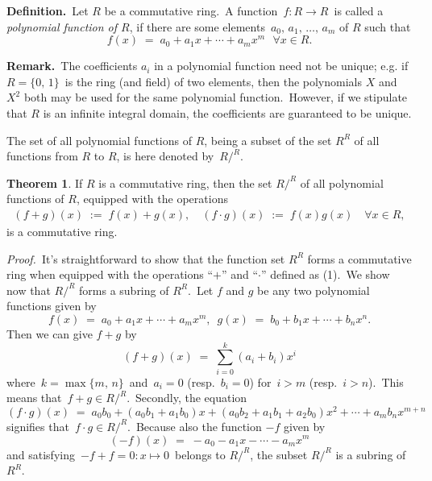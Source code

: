 \documentclass[12pt]{article}
\theoremstyle{definition}
\newtheorem*{thmplain}{Theorem}
\begin{document}
\textbf{Definition.}\, Let $R$ be a commutative ring.\, A function \,$f: R\to R$\, is called a {\em polynomial function of $R$}, if there are some elements \,$a_0,\,a_1,\,\ldots,\,a_m$ of $R$ such that
   $$f(x) \;=\; a_0\!+\!a_1x\!+\cdots+\!a_mx^m \,\,\,\, \forall x\in R.$$

\textbf{Remark.}\, The coefficients $a_i$ in a polynomial function need not be unique; e.g. if\, $R = \{0,\,1\}$\, is the ring (and field) of two elements, then the polynomials $X$ and $X^2$ both may be used for the same polynomial function.\, However, if we stipulate that $R$ is an infinite integral domain, the coefficients are guaranteed to be unique.

The set of all polynomial functions of $R$, being a subset of the set $R^R$ of all functions from $R$ to $R$, is here denoted by\, $R/^R$.

\begin{thmplain}
If $R$ is a commutative ring, then the set $R/^R$ of all polynomial functions of $R$, equipped with the operations 
\begin{align}
(f\!+\!g)(x) \;:=\; f(x)\!+\!g(x), \quad (f\!\cdot\!g)(x) \;:=\; f(x)g(x) \quad \forall x\in R,
\end{align}
is a commutative ring.
\end{thmplain}

{\em Proof.}\, It's straightforward to show that the function set $R^R$ forms a commutative ring when equipped with the operations ``$+$'' and ``$\cdot$'' defined as (1).\, We show now that $R/^R$ forms a subring of $R^R$.\, Let $f$ and $g$ be any two polynomial functions given by
$$f(x) \;=\; a_0\!+\!a_1x\!+\cdots+\!a_mx^m, \,\,\, g(x) \;=\; b_0\!+\!b_1x\!+\cdots+\!b_nx^n.$$
Then we can give $f\!+\!g$ by
  $$(f\!+\!g)(x) \;=\; \sum_{i=0}^k(a_i\!+\!b_i)x^i$$
where\, $k = \max\{m,\,n\}$\, and\, $a_i = 0$ (resp.\, $b_i = 0$) for\, $i > m$ (resp.\, $i > n$).\, This means that\, $f\!+\!g \in R/^R$.\, Secondly, the equation
$$(f\!\cdot\!g)(x) \;=\; a_0b_0+(a_0b_1\!+\!a_1b_0)x+(a_0b_2\!+\!a_1b_1\!+\!a_2b_0)x^2\!+\cdots+\!a_mb_nx^{m+n}$$
signifies that\, $f\!\cdot\!g \in R/^R$.\, Because also the function $-\!f$ given by
  $$(-\!f)(x) \;=\; -\!a_0\!-\!a_1x\!-\cdots-\!a_mx^m$$
and satisfying\, $-\!f\!+\!f = 0:x\mapsto 0$\, belongs to $R/^R$, the subset 
$R/^R$ is a subring of $R^R$.
\end{document}
